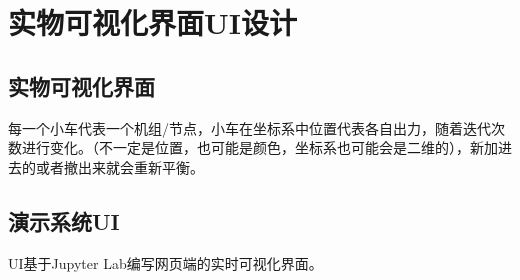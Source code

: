 \chapter{实物可视化界面UI设计}
\label{cha:UI}

\section{实物可视化界面}

每一个小车代表一个机组/节点，小车在坐标系中位置代表各自出力，随着迭代次数进行变化。（不一定是位置，也可能是颜色，坐标系也可能会是二维的），新加进去的或者撤出来就会重新平衡。

\section{演示系统UI}

UI基于Jupyter Lab编写网页端的实时可视化界面。